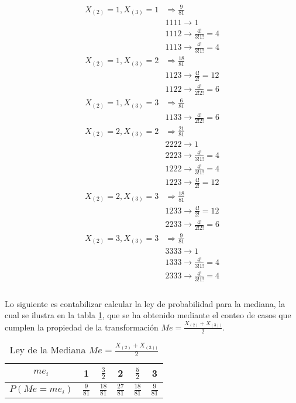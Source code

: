 \documentclass{article}
\begin{document}
      \begin{align*}
        X_{(2)} = 1,X_{(3)} = 1 & \Rightarrow \frac{9}{81}\\
        &1111 \rightarrow 1 \\
        &1112 \rightarrow \frac{4!}{3!1!} = 4 \\
        &1113 \rightarrow \frac{4!}{3!1!} = 4 \\
        X_{(2)} = 1,X_{(3)} = 2 & \Rightarrow \frac{18}{81}\\
        &1123 \rightarrow \frac{4!}{2!} = 12 \\
        &1122 \rightarrow \frac{4!}{2!2!} = 6  \\
        X_{(2)} = 1,X_{(3)} = 3 & \Rightarrow \frac{6}{81}\\
        &1133 \rightarrow \frac{4!}{2!2!} = 6  \\
        X_{(2)} = 2,X_{(3)} = 2 & \Rightarrow \frac{21}{81}\\
        &2222 \rightarrow 1 \\
        &2223 \rightarrow \frac{4!}{3!1!} = 4 \\
        &1222 \rightarrow \frac{4!}{3!1!} = 4 \\
        &1223 \rightarrow \frac{4!}{2!} = 12 \\
        X_{(2)} = 2,X_{(3)} = 3 & \Rightarrow \frac{18}{81}\\
        &1233 \rightarrow \frac{4!}{2!} = 12 \\
        &2233 \rightarrow \frac{4!}{2!2!} = 6  \\
        X_{(2)} = 3,X_{(3)} = 3 & \Rightarrow \frac{9}{81}\\
        &3333 \rightarrow 1 \\
        &1333 \rightarrow \frac{4!}{3!1!} = 4 \\
        &2333 \rightarrow \frac{4!}{3!1!} = 4 \\
      \end{align*}

      \paragraph{}
      Lo siguiente es contabilizar calcular la ley de probabilidad para la mediana, la cual se ilustra en la tabla \ref{table:median}, que se ha obtenido mediante el conteo de casos que cumplen la propiedad de la transformación $Me = \frac{X_{(2)}+X_{(3))}}{2}$.

      \begin{table}[H]
        \centering
        \begin{tabular}{ c | c c c c c|}
          $me_i$       & 1               & $\frac{3}{2}$   & 2               & $\frac{5}{2}$   & 3               \\ \hline
          $P(Me = me_i)$  & $\frac{9}{81}$  & $\frac{18}{81}$ & $\frac{27}{81}$ & $\frac{18}{81}$ & $\frac{9}{81}$
        \end{tabular}
        \caption{Ley de la Mediana $Me = \frac{X_{(2)}+X_{(3))}}{2}$ }
        \label{table:median}
      \end{table}

  \nocite{prob2017}


  
  
\end{document}
